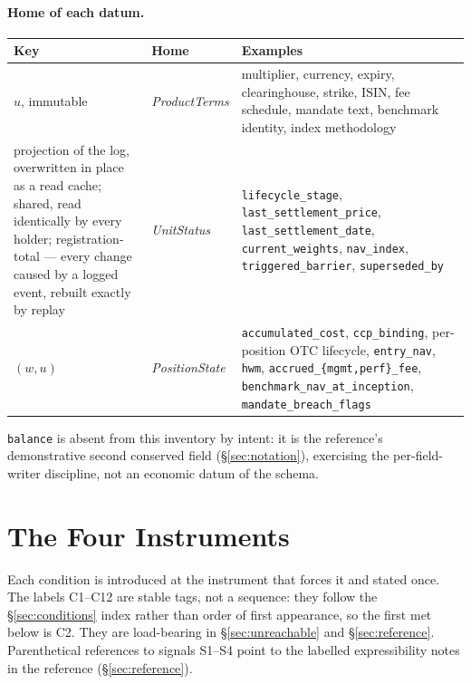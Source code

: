 \documentclass[11pt,a4paper]{article}
\begin{document}
\paragraph{Home of each datum.}
\begin{longtable}{p{6.0cm}p{2.4cm}p{6.0cm}}
\toprule
\textbf{Key} & \textbf{Home} & \textbf{Examples} \\
\midrule
$u$, immutable & \emph{ProductTerms} & multiplier, currency, expiry, clearinghouse, strike,
ISIN, fee schedule, mandate text, benchmark identity, index methodology \\
\addlinespace
projection of the log, overwritten in place as a read cache; shared, read identically by every holder; registration-total --- every change caused by a logged event, rebuilt exactly by replay & \emph{UnitStatus} & \texttt{lifecycle\_stage},
\texttt{last\_settlement\_price}, \texttt{last\_settlement\_date},
\texttt{current\_weights}, \texttt{nav\_index}, \texttt{triggered\_barrier},
\texttt{superseded\_by} \\
\addlinespace
$(w,u)$ & \emph{PositionState} & \texttt{accumulated\_cost}, \texttt{ccp\_binding},
per-position OTC lifecycle, \texttt{entry\_nav}, \texttt{hwm},
\texttt{accrued\_\{mgmt,perf\}\_fee}, \texttt{benchmark\_nav\_at\_inception},
\texttt{mandate\_breach\_flags} \\
\bottomrule
\end{longtable}

\noindent \texttt{balance} is absent from this inventory by intent: it is the reference's
demonstrative second conserved field (\S\ref{sec:notation}), exercising the per-field-writer
discipline, not an economic datum of the schema.

\section{The Four Instruments}
\label{sec:testcases}

Each condition is introduced at the instrument that forces it and stated once. The labels
C1--C12 are stable tags, not a sequence: they follow the \S\ref{sec:conditions} index rather
than order of first appearance, so the first met below is C2. They are load-bearing in
\S\ref{sec:unreachable} and \S\ref{sec:reference}. Parenthetical references to signals
S1--S4 point to the labelled expressibility notes in the reference (\S\ref{sec:reference}).
\end{document}
